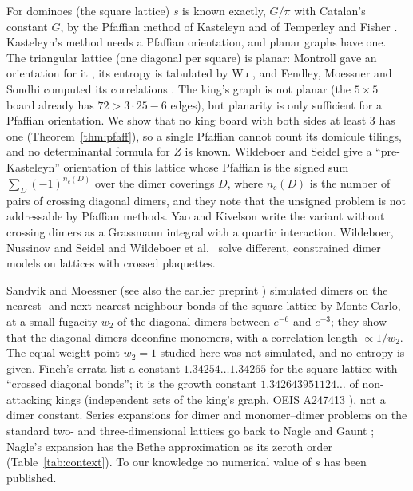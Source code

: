 \documentclass[11pt]{amsart}
\theoremstyle{definition}
\theoremstyle{remark}
\begin{document}
For dominoes (the square lattice) $s$ is known exactly, $G/\pi$ with Catalan's constant $G$, by
the Pfaffian method of Kasteleyn and of Temperley and Fisher \cite{kasteleyn1961,
temperleyfisher1961}. Kasteleyn's method needs a Pfaffian orientation, and planar graphs have
one. The triangular lattice (one diagonal per square) is planar: Montroll gave an orientation
for it \cite{montroll1964}, its entropy is tabulated by Wu \cite{wu2006}, and Fendley, Moessner
and Sondhi computed its correlations \cite{fms2002}. The king's graph is not planar (the
$5 \times 5$ board already has $72 > 3\cdot 25 - 6$ edges), but planarity is only sufficient for a
Pfaffian orientation. We show that no king board with both sides at least $3$ has one
(Theorem~\ref{thm:pfaff}), so a single Pfaffian cannot count its domicule tilings, and no
determinantal formula for $Z$ is known. Wildeboer and Seidel \cite{wildeboerseidel2020} give a
``pre-Kasteleyn'' orientation of this lattice whose Pfaffian is the signed sum
$\sum_D (-1)^{n_c(D)}$ over the dimer coverings $D$, where $n_c(D)$ is the number of pairs of
crossing diagonal dimers, and they note that the unsigned problem is not addressable by Pfaffian
methods. Yao and Kivelson \cite{yaokivelson2012} write the variant without crossing dimers as a
Grassmann integral with a quartic interaction. Wildeboer, Nussinov and Seidel
\cite{wildeboernussinovseidel2020} and Wildeboer et al.\ \cite{wildeboer2026} solve different,
constrained dimer models on lattices with crossed plaquettes.

Sandvik and Moessner \cite{sandvikmoessner2006} (see also the earlier preprint \cite{sandvik2003})
simulated dimers on the nearest- and next-nearest-neighbour bonds of the square lattice by Monte
Carlo, at a small fugacity $w_2$ of the diagonal dimers between $e^{-6}$ and $e^{-3}$; they show
that the diagonal dimers deconfine monomers, with a correlation length $\propto 1/w_2$. The
equal-weight point $w_2 = 1$ studied here was not simulated, and no entropy is given. Finch's
errata \cite[\S 5.12]{finch2020errata} list a constant $1.34254\ldots 1.34265$ for the square
lattice with ``crossed diagonal bonds''; it is the growth constant $1.342643951124\ldots$ of
non-attacking kings (independent sets of the king's graph, OEIS A247413 \cite{oeisA247413}), not a
dimer constant. Series expansions for dimer and monomer--dimer problems on the standard two- and
three-dimensional lattices go back to Nagle \cite{nagle1966} and Gaunt \cite{gaunt1969}; Nagle's
expansion has the Bethe approximation as its zeroth order (Table~\ref{tab:context}). To our
knowledge no numerical value of $s$ has been published.
\end{document}
